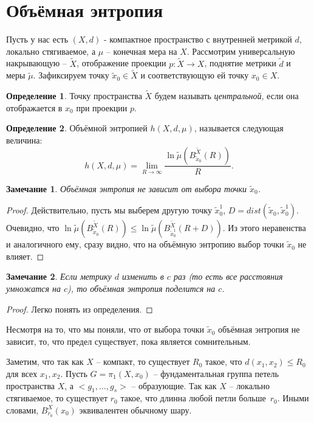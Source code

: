 \documentclass[11pt]{article}
\theoremstyle{definition}
\newtheorem{defin}{Определение}%
\theoremstyle{plain}
\theoremstyle{plain}
\newtheorem{remark}{Замечание}
\def\leq{\leqslant}
\def\wt#1{\widetilde{#1}}
\begin{document}
\section{Объёмная энтропия}
Пусть у нас есть $(X, d)$ - компактное пространство с внутренней метрикой $d$, локально стягиваемое, 
а $\mu$ -- конечная мера на $X$. Рассмотрим универсальную накрывающую -- $\wt{X}$, отображение проекции $p : \wt{X} \rightarrow X$, 
поднятие метрики $\wt{d}$ и меры $\wt{\mu}$.
Зафиксируем точку $\wt{x}_0 \in \wt{X}$ и соответствующую ей точку $x_0 \in X$.
\begin{defin}
Точку пространства $\wt{X}$  будем называть {\it центральной}, если она отображается в $x_0$ при проекции $p$.
\end{defin}

\begin{defin}
	Объёмной энтропией $h(X, d, \mu)$, называется следующая величина:
	$$
	h(X, d, \mu) = \lim_{R \rightarrow \infty} \frac{\ln\wt{\mu}\left(B_{\wt{x}_0}^{\wt{X}}(R)\right)} {R}.
	$$
\end{defin}


\begin{remark}
Объёмная энтропия не зависит от выбора точки $\wt{x}_0$.
\end{remark}
\begin{proof}
Действительно, пусть мы выберем другую точку $\wt{x}^1_0$, $D = dist(\wt{x}_0, \wt{x}_0^1)$.
Очевидно, что $\ln\wt{\mu}\left(B_{\wt{x}_0}^{\wt{X}}(R)\right) \leq 
\ln\wt{\mu}\left(B_{\wt{x}_0^1}^{\wt{X}}(R + D)\right)$. Из этого неравенства и аналогичного ему, сразу видно, 
что на объёмную энтропию выбор точки $\wt{x}_0$ не влияет.
\end{proof}

\begin{remark}
Если метрику $d$ изменить в $c$ раз (то есть все расстояния умножатся на $c$), то объёмная энтропия поделится на $c$.
\end{remark}
\begin{proof}
Легко понять из определения.
\end{proof}

Несмотря на то, что мы поняли, что от выбора точки $\wt{x}_0$ объёмная энтропия не зависит, 
то, что предел существует, пока является сомнительным.

Заметим, что так как $X$ -- компакт, то существует $R_0$ такое, что $d(x_1, x_2) \leq R_0$ для всех $x_1, x_2$.
Пусть $G = \pi_1(X, x_0)$ -- фундаментальная группа петель пространства $X$, а $<g_1,\dots,g_s>$ -- образующие.
Так как $X$ -- локально стягиваемое, то существует $r_0$ такое, что длинна любой петли больше~$r_0$. 
Иными словами, $B_{r_0}^X(x_0)$ эквивалентен обычному шару.
\end{document}

